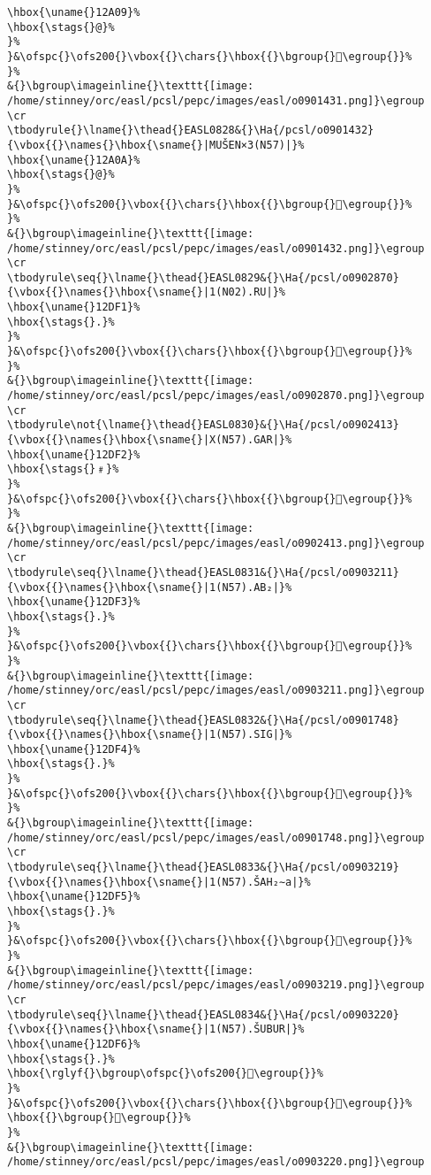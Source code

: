 \begin{verbatim}
\hbox{\uname{}12A09}%
\hbox{\stags{}@}%
}%
}&\ofspc{}\ofs200{}\vbox{{}\chars{}\hbox{{}\bgroup{}𒨉\egroup{}}%
}%
&{}\bgroup\imageinline{}\texttt{[image: /home/stinney/orc/easl/pcsl/pepc/images/easl/o0901431.png]}\egroup
\cr
\tbodyrule{}\lname{}\thead{}EASL0828&{}\Ha{/pcsl/o0901432}{\vbox{{}\names{}\hbox{\sname{}|MUŠEN×3(N57)|}%
\hbox{\uname{}12A0A}%
\hbox{\stags{}@}%
}%
}&\ofspc{}\ofs200{}\vbox{{}\chars{}\hbox{{}\bgroup{}𒨊\egroup{}}%
}%
&{}\bgroup\imageinline{}\texttt{[image: /home/stinney/orc/easl/pcsl/pepc/images/easl/o0901432.png]}\egroup
\cr
\tbodyrule\seq{}\lname{}\thead{}EASL0829&{}\Ha{/pcsl/o0902870}{\vbox{{}\names{}\hbox{\sname{}|1(N02).RU|}%
\hbox{\uname{}12DF1}%
\hbox{\stags{}.}%
}%
}&\ofspc{}\ofs200{}\vbox{{}\chars{}\hbox{{}\bgroup{}𒷱\egroup{}}%
}%
&{}\bgroup\imageinline{}\texttt{[image: /home/stinney/orc/easl/pcsl/pepc/images/easl/o0902870.png]}\egroup
\cr
\tbodyrule\not{\lname{}\thead{}EASL0830}&{}\Ha{/pcsl/o0902413}{\vbox{{}\names{}\hbox{\sname{}|X(N57).GAR|}%
\hbox{\uname{}12DF2}%
\hbox{\stags{}﹟}%
}%
}&\ofspc{}\ofs200{}\vbox{{}\chars{}\hbox{{}\bgroup{}𒷲\egroup{}}%
}%
&{}\bgroup\imageinline{}\texttt{[image: /home/stinney/orc/easl/pcsl/pepc/images/easl/o0902413.png]}\egroup
\cr
\tbodyrule\seq{}\lname{}\thead{}EASL0831&{}\Ha{/pcsl/o0903211}{\vbox{{}\names{}\hbox{\sname{}|1(N57).AB₂|}%
\hbox{\uname{}12DF3}%
\hbox{\stags{}.}%
}%
}&\ofspc{}\ofs200{}\vbox{{}\chars{}\hbox{{}\bgroup{}𒷳\egroup{}}%
}%
&{}\bgroup\imageinline{}\texttt{[image: /home/stinney/orc/easl/pcsl/pepc/images/easl/o0903211.png]}\egroup
\cr
\tbodyrule\seq{}\lname{}\thead{}EASL0832&{}\Ha{/pcsl/o0901748}{\vbox{{}\names{}\hbox{\sname{}|1(N57).SIG|}%
\hbox{\uname{}12DF4}%
\hbox{\stags{}.}%
}%
}&\ofspc{}\ofs200{}\vbox{{}\chars{}\hbox{{}\bgroup{}𒷴\egroup{}}%
}%
&{}\bgroup\imageinline{}\texttt{[image: /home/stinney/orc/easl/pcsl/pepc/images/easl/o0901748.png]}\egroup
\cr
\tbodyrule\seq{}\lname{}\thead{}EASL0833&{}\Ha{/pcsl/o0903219}{\vbox{{}\names{}\hbox{\sname{}|1(N57).ŠAH₂∼a|}%
\hbox{\uname{}12DF5}%
\hbox{\stags{}.}%
}%
}&\ofspc{}\ofs200{}\vbox{{}\chars{}\hbox{{}\bgroup{}𒷵\egroup{}}%
}%
&{}\bgroup\imageinline{}\texttt{[image: /home/stinney/orc/easl/pcsl/pepc/images/easl/o0903219.png]}\egroup
\cr
\tbodyrule\seq{}\lname{}\thead{}EASL0834&{}\Ha{/pcsl/o0903220}{\vbox{{}\names{}\hbox{\sname{}|1(N57).ŠUBUR|}%
\hbox{\uname{}12DF6}%
\hbox{\stags{}.}%
\hbox{\rglyf{}\bgroup\ofspc{}\ofs200{}𒷶\egroup{}}%
}%
}&\ofspc{}\ofs200{}\vbox{{}\chars{}\hbox{{}\bgroup{}𒷷\egroup{}}%
\hbox{{}\bgroup{}𒷶\egroup{}}%
}%
&{}\bgroup\imageinline{}\texttt{[image: /home/stinney/orc/easl/pcsl/pepc/images/easl/o0903220.png]}\egroup

\end{verbatim}
